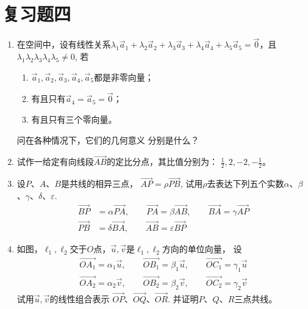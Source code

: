 \section*{复习题四}
\begin{enumerate}

\item 在空间中，设有线性关系$\lambda_1\vec{a}_1+\lambda_2\vec{a}_2+\lambda_3\vec{a}_3+\lambda_4\vec{a}_4+\lambda_5\vec{a}_5=\vec{0}$，且$\lambda_1\lambda_2\lambda_3\lambda_4\lambda_5\ne 0$, 若
\begin{enumerate}
    \item $\vec{a}_1,\vec{a}_2,\vec{a}_3,\vec{a}_4,\vec{a}_5$都是非零向量；
    \item 有且只有$\vec{a}_4=\vec{a}_5=\vec{0}$；
    \item 有且只有三个零向量。
\end{enumerate}
问在各种情况下，它们的几何意义
分别是什么？
\item 试作一给定有向线段$\Vec{AB}$的定比分点，其比值分别为：
$\frac{1}{2},2,-2,-\frac{1}{2}$。
\item 设$P$、$A$、$B$是共线的相异三点，
$\Vec{AP}=\rho\Vec{PB}$, 
试用$\rho$去表达下列五个实数$\alpha$、$\beta$、$\gamma$、$\delta$、$\varepsilon$.
\[\begin{split}
    \Vec{BP}&=\alpha\Vec{PA},\qquad \Vec{PA}=\beta\Vec{AB},\qquad \Vec{BA}=\gamma\Vec{AP}\\
    \Vec{PB}&=\delta\Vec{BA},\qquad \Vec{AB}=\varepsilon\Vec{BP}
\end{split}\]
\item 如图，$\ell_1,\ell_2$交于$O$点，$\vec{u},\vec{v}$是$\ell_1,\ell_2$方向的单位向量，
设
\[\begin{split}
    \Vec{OA_1}=\alpha_1\vec{u},\qquad  \Vec{OB_1}=\beta_1\vec{u},\qquad  \Vec{OC_1}=\gamma_1\vec{u}\\
    \Vec{OA_2}=\alpha_2\vec{v},\qquad  \Vec{OB_2}=\beta_2\vec{v},\qquad  \Vec{OC_2}=\gamma_2\vec{v}
\end{split}\]
试用$\vec{u},\vec{v}$的线性组合表示
$\Vec{OP}$、$\Vec{OQ}$、$\Vec{OR}$. 并证明$P$、$Q$、$R$三点共线。

\begin{figure}[htp]
    \centering
{}
\end{figure}
\end{enumerate}
